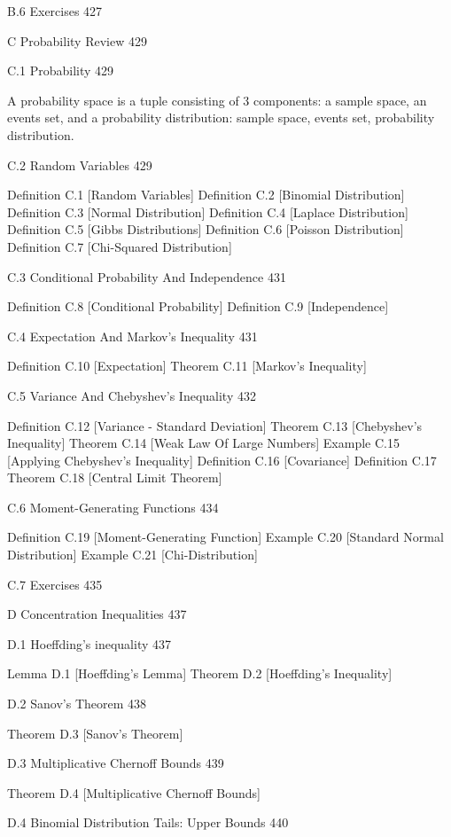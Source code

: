 B.6 Exercises 427



C Probability Review 429



C.1 Probability 429

A probability space is a tuple consisting of 3 components: a sample space, an events set, and a probability distribution: sample space, events set, probability distribution.

C.2 Random Variables 429

Definition C.1 [Random Variables]
Definition C.2 [Binomial Distribution]
Definition C.3 [Normal Distribution]
Definition C.4 [Laplace Distribution]
Definition C.5 [Gibbs Distributions]
Definition C.6 [Poisson Distribution]
Definition C.7 [Chi-Squared Distribution]

C.3 Conditional Probability And Independence 431

Definition C.8 [Conditional Probability]
Definition C.9 [Independence]

C.4 Expectation And Markov's Inequality 431

Definition C.10 [Expectation]
Theorem C.11 [Markov's Inequality]

C.5 Variance And Chebyshev's Inequality 432

Definition C.12 [Variance - Standard Deviation]
Theorem C.13 [Chebyshev's Inequality]
Theorem C.14 [Weak Law Of Large Numbers]
Example C.15 [Applying Chebyshev's Inequality]
Definition C.16 [Covariance]
Definition C.17
Theorem C.18 [Central Limit Theorem]

C.6 Moment-Generating Functions 434

Definition C.19 [Moment-Generating Function]
Example C.20 [Standard Normal Distribution]
Example C.21 [Chi-Distribution]

C.7 Exercises 435



D Concentration Inequalities 437



D.1 Hoeffding's inequality 437

Lemma D.1 [Hoeffding's Lemma]
Theorem D.2 [Hoeffding's Inequality]

D.2 Sanov's Theorem 438

Theorem D.3 [Sanov's Theorem]

D.3 Multiplicative Chernoff Bounds 439

Theorem D.4 [Multiplicative Chernoff Bounds]

D.4 Binomial Distribution Tails: Upper Bounds 440



